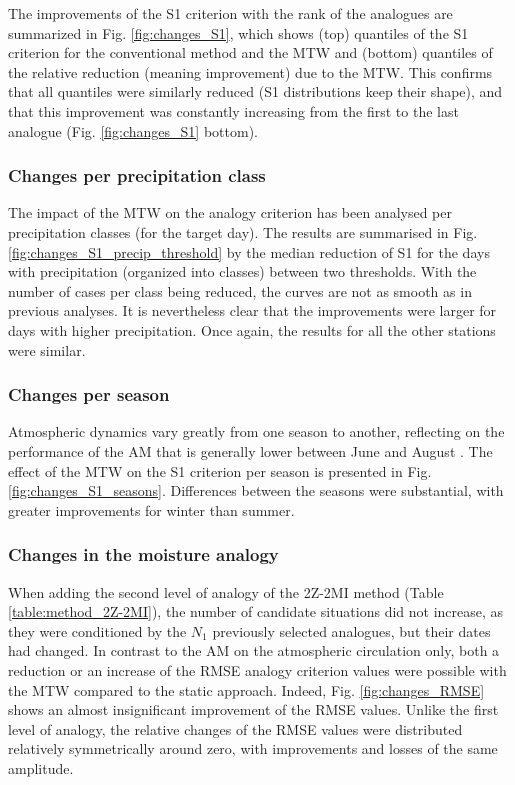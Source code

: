 \documentclass[hess, manuscript]{copernicus}
\begin{document}
	The improvements of the S1 criterion with the rank of the analogues are summarized in Fig. \ref{fig:changes_S1}, which shows (top) quantiles of the S1 criterion for the conventional method and the MTW and (bottom) quantiles of the relative reduction (meaning improvement) due to the MTW. This confirms that all quantiles were similarly reduced (S1 distributions keep their shape), and that this improvement was constantly increasing from the first to the last analogue (Fig. \ref{fig:changes_S1} bottom).
	
	
	\subsubsection{Changes per precipitation class}
	\label{sec:influence_precip}
	
	The impact of the MTW on the analogy criterion has been analysed per precipitation classes (for the target day). The results are summarised in Fig. \ref{fig:changes_S1_precip_threshold} by the median reduction of S1 for the days with precipitation (organized into classes) between two thresholds. With the number of cases per class being reduced, the curves are not as smooth as in previous analyses. It is nevertheless clear that the improvements were larger for days with higher precipitation. Once again, the results for all the other stations were similar.
	
	
	\subsubsection{Changes per season}
	\label{sec:seasonal_effect}
	
	Atmospheric dynamics vary greatly from one season to another, reflecting on the performance of the AM that is generally lower between June and August \citep{Bliefernicht2010}. The effect of the MTW on the S1 criterion per season is presented in Fig. \ref{fig:changes_S1_seasons}. Differences between the seasons were substantial, with greater improvements for winter than summer. 
	
	
	\subsubsection{Changes in the moisture analogy}
	\label{sec:perf_2Z-2MI}
	
	When adding the second level of analogy of the 2Z-2MI method (Table \ref{table:method_2Z-2MI}), the number of candidate situations did not increase, as they were conditioned by the $N_{1}$ previously selected analogues, but their dates had changed. In contrast to the AM on the atmospheric circulation only, both a reduction or an increase of the RMSE analogy criterion values were possible with the MTW compared to the static approach. Indeed, Fig. \ref{fig:changes_RMSE} shows an almost insignificant improvement of the RMSE values. Unlike the first level of analogy, the relative changes of the RMSE values were distributed relatively symmetrically around zero, with improvements and losses of the same amplitude.
	
\end{document}
